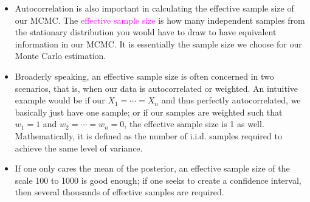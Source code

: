 \documentclass[UTF8]{book}
\newcommand{\concept}[1]{\textcolor{magenta}{#1}}
\begin{document}
\begin{itemize}
\begin{itemize}
	\item Autocorrelation is also important in calculating the effective sample size of our MCMC. The \concept{effective sample size} is how many independent samples from the stationary distribution you would have to draw to have equivalent information in our MCMC. It is essentially the sample size we choose for our Monte Carlo estimation.
	\item Broaderly speaking, an effective sample size is often concerned in two scenarios, that is, when our data is autocorrelated or weighted. An intuitive example would be if our $X_1=\cdots=X_n$ and thus perfectly autocorrelated, we basically just have one sample; or if our samples are weighted such that $w_1=1$ and $w_2=\cdots=w_n=0$, the effective sample size is 1 as well. Mathematically, it is defined as the number of i.i.d. samples required to achieve the same level of variance.
	\item If one only cares the mean of the posterior, an effective sample size of the scale 100 to 1000 is good enough; if one seeks to create a confidence interval, then several thousands of effective samples are required.
\end{itemize}
\end{itemize}
\end{document}
